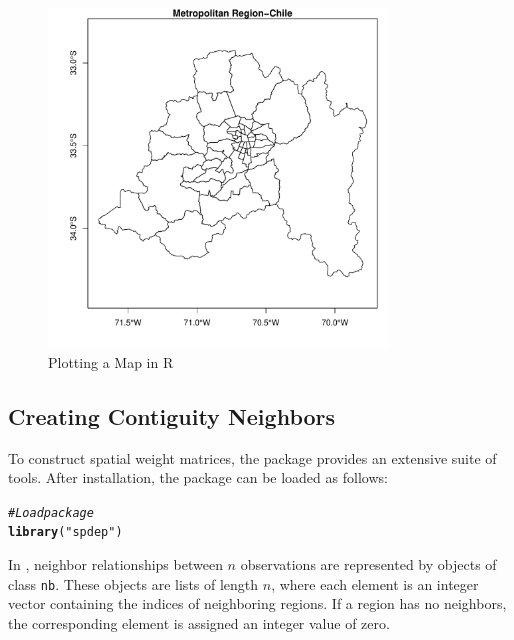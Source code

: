 \documentclass[english,12pt]{book}\usepackage[]{graphicx}\usepackage[]{xcolor}
\makeatletter
\newcommand{\hlsng}[1]{\textcolor[rgb]{0.192,0.494,0.8}{#1}}%
\newcommand{\hlcom}[1]{\textcolor[rgb]{0.678,0.584,0.686}{\textit{#1}}}%
\newcommand{\hldef}[1]{\textcolor[rgb]{0.345,0.345,0.345}{#1}}%
\newcommand{\hlkwd}[1]{\textcolor[rgb]{0.737,0.353,0.396}{\textbf{#1}}}%
\newenvironment{kframe}{%
 \def\at@end@of@kframe{}%
 \ifinner\ifhmode%
  \def\at@end@of@kframe{\end{minipage}}%
  \begin{minipage}{\columnwidth}%
 \fi\fi%
 \def\FrameCommand##1{\hskip\@totalleftmargin \hskip-\fboxsep
 \colorbox{shadecolor}{##1}\hskip-\fboxsep
     \hskip-\linewidth \hskip-\@totalleftmargin \hskip\columnwidth}%
 \MakeFramed {\advance\hsize-\width
   \@totalleftmargin\z@ \linewidth\hsize
   \@setminipage}}%
 {\par\unskip\endMakeFramed%
 \at@end@of@kframe}
\newenvironment{knitrout}{}{} %
\makeatother
\begin{document}
\begin{figure}[h]
  \caption{Plotting a Map in R}
    \label{fig:plot_mr}
\begin{knitrout}
\color{fgcolor}

{\centering \includegraphics[width=9cm,height=9cm]{figure/plot_mr-1} 

}


\end{knitrout}
\end{figure}

\subsection{Creating Contiguity Neighbors}\label{sec:computing-W-in-R}

To construct spatial weight matrices, the  package \citep{bivand2013computing} provides an extensive suite of tools. After installation, the package can be loaded as follows:

\begin{knitrout}
\color{fgcolor}\begin{kframe}
\begin{alltt}
\hlcom{#Load package}
\hlkwd{library}\hldef{(}\hlsng{"spdep"}\hldef{)}
\end{alltt}
\end{kframe}
\end{knitrout}

In , neighbor relationships between $n$ observations are represented by objects of class \texttt{nb}. These objects are lists of length $n$, where each element is an integer vector containing the indices of neighboring regions. If a region has no neighbors, the corresponding element is assigned an integer value of zero.
\end{document}

